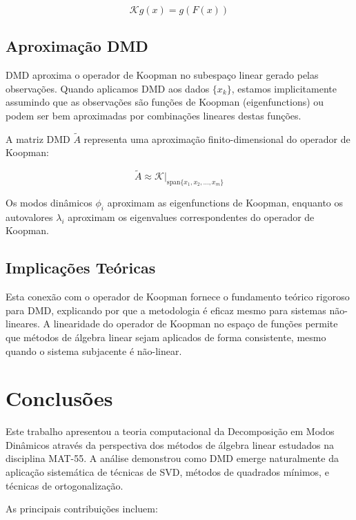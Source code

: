 \documentclass[a4,11pt]{pssbmac}
\begin{document}
\begin{equation}
\mathcal{K}g(x) = g(F(x)) \label{eq:koopman_operator}
\end{equation}

\subsection{Aproximação DMD}

DMD aproxima o operador de Koopman no subespaço linear gerado pelas observações. Quando aplicamos DMD aos dados $\{x_k\}$, estamos implicitamente assumindo que as observações são funções de Koopman (eigenfunctions) ou podem ser bem aproximadas por combinações lineares destas funções.

A matriz DMD $\tilde{A}$ representa uma aproximação finito-dimensional do operador de Koopman:

\begin{equation}
\tilde{A} \approx \mathcal{K}|_{\text{span}\{x_1, x_2, \ldots, x_m\}} \label{eq:dmd_koopman_approximation}
\end{equation}

Os modos dinâmicos $\phi_i$ aproximam as eigenfunctions de Koopman, enquanto os autovalores $\lambda_i$ aproximam os eigenvalues correspondentes do operador de Koopman.

\subsection{Implicações Teóricas}

Esta conexão com o operador de Koopman fornece o fundamento teórico rigoroso para DMD, explicando por que a metodologia é eficaz mesmo para sistemas não-lineares. A linearidade do operador de Koopman no espaço de funções permite que métodos de álgebra linear sejam aplicados de forma consistente, mesmo quando o sistema subjacente é não-linear.

\section{Conclusões}

Este trabalho apresentou a teoria computacional da Decomposição em Modos Dinâmicos através da perspectiva dos métodos de álgebra linear estudados na disciplina MAT-55. A análise demonstrou como DMD emerge naturalmente da aplicação sistemática de técnicas de SVD, métodos de quadrados mínimos, e técnicas de ortogonalização.

As principais contribuições incluem:
\end{document}
